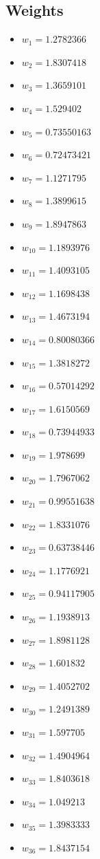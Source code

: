 \documentclass[11pt]{article}
\begin{document}
\subsection*{Weights}
\begin{itemize}
\item $w_{1} = 1.2782366$
\item $w_{2} = 1.8307418$
\item $w_{3} = 1.3659101$
\item $w_{4} = 1.529402$
\item $w_{5} = 0.73550163$
\item $w_{6} = 0.72473421$
\item $w_{7} = 1.1271795$
\item $w_{8} = 1.3899615$
\item $w_{9} = 1.8947863$
\item $w_{10} = 1.1893976$
\item $w_{11} = 1.4093105$
\item $w_{12} = 1.1698438$
\item $w_{13} = 1.4673194$
\item $w_{14} = 0.80080366$
\item $w_{15} = 1.3818272$
\item $w_{16} = 0.57014292$
\item $w_{17} = 1.6150569$
\item $w_{18} = 0.73944933$
\item $w_{19} = 1.978699$
\item $w_{20} = 1.7967062$
\item $w_{21} = 0.99551638$
\item $w_{22} = 1.8331076$
\item $w_{23} = 0.63738446$
\item $w_{24} = 1.1776921$
\item $w_{25} = 0.94117905$
\item $w_{26} = 1.1938913$
\item $w_{27} = 1.8981128$
\item $w_{28} = 1.601832$
\item $w_{29} = 1.4052702$
\item $w_{30} = 1.2491389$
\item $w_{31} = 1.597705$
\item $w_{32} = 1.4904964$
\item $w_{33} = 1.8403618$
\item $w_{34} = 1.049213$
\item $w_{35} = 1.3983333$
\item $w_{36} = 1.8437154$

\end{itemize}
\end{document}
